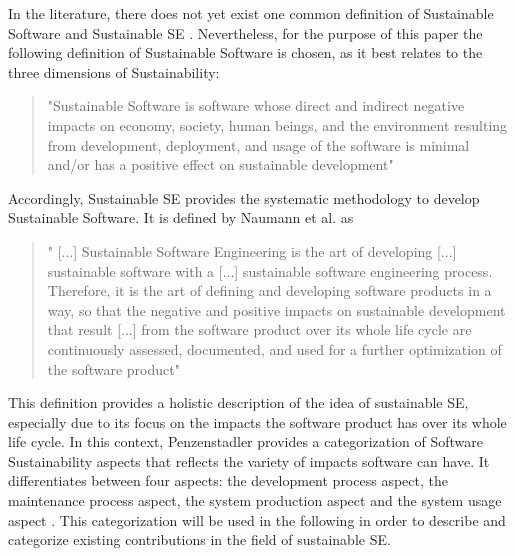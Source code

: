 \documentclass[oribibl]{llncs}
\begin{document}
In the literature, there does not yet exist one common definition of Sustainable Software and Sustainable SE \cite{venters_software_2014}. Nevertheless, for the purpose of this paper the following definition of Sustainable Software is chosen, as it best relates to the three dimensions of Sustainability: 
\begin{quote}
	"Sustainable Software is software whose direct and indirect negative impacts on economy, society, human beings, and the environment resulting from development, deployment, and usage of the software is minimal and/or has a positive effect on sustainable development" \cite[p.\,3]{dick_model_2010}
\end{quote}
Accordingly, Sustainable SE provides the systematic methodology to develop Sustainable Software. It is defined by Naumann et al. as
\begin{quote}
	" [...] Sustainable Software Engineering is the art of developing [...] sustainable software with a [...] sustainable software engineering process. Therefore, it is the art of defining and developing software products in a way, so that the negative and positive impacts on sustainable development that result [...] from the software product over its whole life cycle are continuously assessed, documented, and used for a further optimization of the software product" \cite[p.\,3]{naumann_greensoft_2011} %
\end{quote}
This definition provides a holistic description of the idea of sustainable SE, especially due to its focus on the impacts the software product has over its whole life cycle. %
In this context, Penzenstadler \cite{penzenstadler_supporting_2012} provides a categorization of Software Sustainability aspects that reflects the variety of impacts software can have. It differentiates between four aspects: the development process aspect, the maintenance process aspect, the system production aspect and the system usage aspect \cite{penzenstadler_supporting_2012}. %
This categorization will be used in the following in order to describe and categorize existing contributions in the field of sustainable SE.
\end{document}
